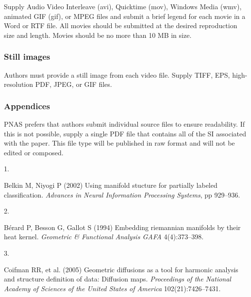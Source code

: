 \documentclass[9pt,twocolumn,twoside,]{pnas-new}
\newlength{\cslhangindent}
\newlength{\csllabelwidth}
\newlength{\cslentryspacingunit} %
\newenvironment{CSLReferences}[2] %
 {%
  \setlength{\parindent}{0pt}
  \ifodd #1
  \let\oldpar\par
  \def\par{\hangindent=\cslhangindent\oldpar}
  \fi
  \setlength{\parskip}{#2\cslentryspacingunit}
 }%
 {}
\newcommand{\CSLLeftMargin}[1]{\parbox[t]{\csllabelwidth}{#1}}
\newcommand{\CSLRightInline}[1]{\parbox[t]{\linewidth - \csllabelwidth}{#1}\break}
\begin{document}
Supply Audio Video Interleave (avi), Quicktime (mov), Windows Media
(wmv), animated GIF (gif), or MPEG files and submit a brief legend for
each movie in a Word or RTF file. All movies should be submitted at the
desired reproduction size and length. Movies should be no more than 10
MB in size.

\hypertarget{still-images}{%
\subsubsection*{Still images}\label{still-images}}

Authors must provide a still image from each video file. Supply TIFF,
EPS, high-resolution PDF, JPEG, or GIF files.

\hypertarget{appendices}{%
\subsubsection*{Appendices}\label{appendices}}

PNAS prefers that authors submit individual source files to ensure
readability. If this is not possible, supply a single PDF file that
contains all of the SI associated with the paper. This file type will be
published in raw format and will not be edited or composed.

\showmatmethods
\showacknow
\pnasbreak

\hypertarget{refs}{}
\begin{CSLReferences}{0}{0}
\leavevmode{}%
\CSLLeftMargin{1. }%
\CSLRightInline{Belkin M, Niyogi P (2002) Using manifold stucture for
partially labeled classification. \emph{Advances in Neural Information
Processing Systems}, pp 929--936.}

\leavevmode{}%
\CSLLeftMargin{2. }%
\CSLRightInline{Bérard P, Besson G, Gallot S (1994) Embedding riemannian
manifolds by their heat kernel. \emph{Geometric \& Functional Analysis
GAFA} 4(4):373--398.}

\leavevmode{}%
\CSLLeftMargin{3. }%
\CSLRightInline{Coifman RR, et al. (2005) Geometric diffusions as a tool
for harmonic analysis and structure definition of data: Diffusion maps.
\emph{Proceedings of the National Academy of Sciences of the United
States of America} 102(21):7426--7431.}

\end{CSLReferences}



% 
\end{document}
